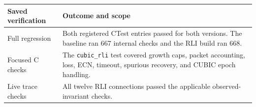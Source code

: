 \begingroup\small\setlength{\tabcolsep}{4pt}\renewcommand{\arraystretch}{1.15}
\noindent\begin{tabular}{|>{\raggedright\arraybackslash}p{}|>{\raggedright\arraybackslash}p{}|}
\hline
\textbf{Saved verification} & \textbf{Outcome and scope} \\ \hline
Full regression & Both registered CTest entries passed for both versions. The baseline ran 667 internal checks and the RLI build ran 668. \\ \hline
Focused C checks & The \texttt{cubic\_rli} test covered growth caps, packet accounting, loss, ECN, timeout, spurious recovery, and CUBIC epoch handling. \\ \hline
Live trace checks & All twelve RLI connections passed the applicable observed-invariant checks. \\ \hline
\end{tabular}\endgroup
\par\vspace{0.6em}

\label{sec:implementation-end}
